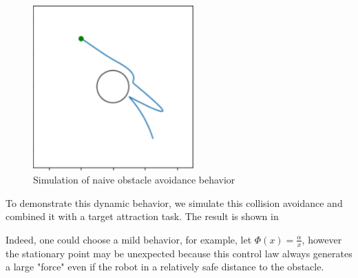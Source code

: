 \begin{figure}
\centering
\includegraphics[width=0.55\textwidth]{Images/Chapter5/sim_obs.png}
\caption{Simulation of naive obstacle avoidance behavior}
\label{fig:sim_obs}
\end{figure}

To demonstrate this dynamic behavior, we simulate this collision avoidance and combined it with a target attraction task. The result is shown in 

Indeed, one could choose a mild behavior, for example, let $\Phi(x) = \frac{\alpha}{x}$, however  the stationary point may be unexpected  because this control law always generates a large "force" even if the robot in a relatively safe distance to the obstacle.





